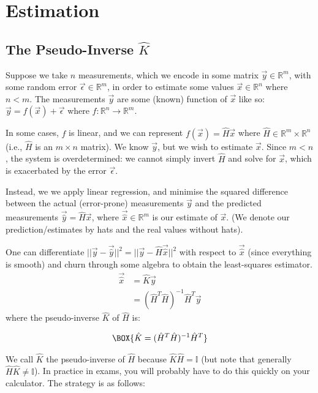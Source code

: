 \chapter{Estimation}\label{Estimation}

\section{The Pseudo-Inverse \texorpdfstring{$\hat{K}$}{K-hat}}

Suppose we take $n$ measurements, which we encode in some matrix $\vec{y}\in\mathbb{R}^m$, with some random error $\vec{\epsilon}\in\mathbb{R}^m$, in order to estimate some values $\vec{x}\in\mathbb{R}^n$ where $n<m$. The measurements $\vec{y}$ are some (known) function of $\vec{x}$ like so: $\vec{y}=f(\vec{x})+\vec{\epsilon}$ where $f:\mathbb{R}^n\to\mathbb{R}^m$.

In some cases, $f$ is linear, and we can represent $f(\vec{x})=\hat{H}\vec{x}$ where $\hat{H}\in\mathbb{R}^m\times\mathbb{R}^n$ (i.e., $\hat{H}$ is an $m\times n$ matrix). We know $\vec{y}$, but we wish to estimate $\vec{x}$. Since $m<n$, the system is overdetermined: we cannot simply invert $\hat{H}$ and solve for $\vec{x}$, which is exacerbated by the error $\vec{\epsilon}$.

Instead, we we apply linear regression, and minimise the squared difference between the actual (error-prone) measurements $\vec{y}$ and the predicted measurements $\vec{\hat{y}}=\hat{H}\vec{x}$, where $\vec{\hat{x}}\in\mathbb{R}^m$ is our estimate of $\vec{x}$. (We denote our prediction/estimates by hats and the real values without hats).

One can differentiate $||\vec{y}-\vec{\hat{y}}||^2=||\vec{y}-\hat{H}\vec{\hat{x}}||^2$ with respect to $\vec{\hat{x}}$ (since everything is smooth) and churn through some algebra to obtain the least-squares estimator.
\begin{align}
    \vec{\hat{x}}& =\hat{K}\vec{y} \\
    & = (\hat{H}^T\hat{H})^{-1}\hat{H}^T\vec{y}
\end{align}
where the pseudo-inverse $\hat{K}$ of $\hat{H}$ is:

\begin{align}
    \BOX{\hat{K}= (\hat{H}^T\hat{H})^{-1}\hat{H}^T}
\end{align}

We call $\hat{K}$ the pseudo-inverse of $\hat{H}$ because $\hat{K}\hat{H}=\mathbb{I}$ (but note that generally $\hat{H}\hat{K}\neq\mathbb{I}$). In practice in exams, you will probably have to do this quickly on your calculator. The strategy is as follows: 


